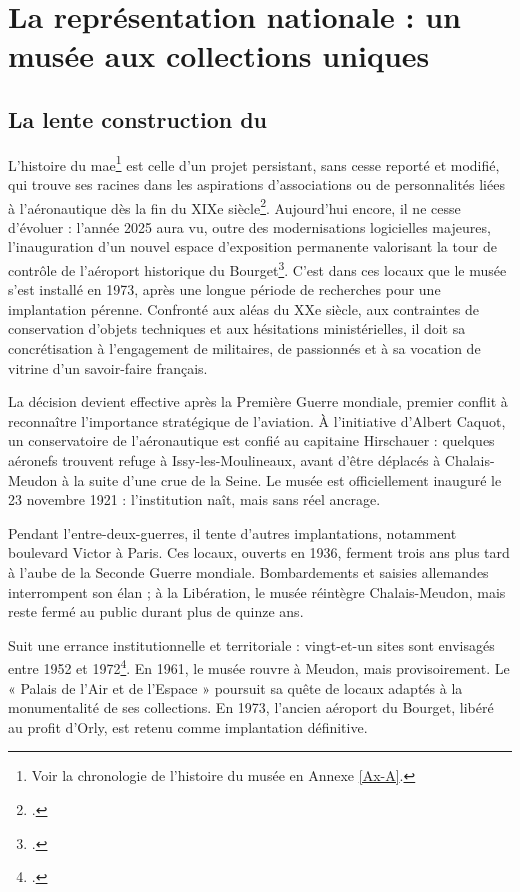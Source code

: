 \section{\label{I-A-1}La représentation nationale : un musée aux collections uniques}

\subsection{La lente construction du \mae}

L’histoire du \acf{mae}\footnote{Voir la chronologie de l'histoire du musée en Annexe \ref{Ax-A}.} est celle d’un projet persistant, sans cesse reporté et modifié, qui trouve ses racines dans les aspirations d'associations ou de personnalités liées à l'aéronautique dès la fin du XIXe siècle\footcite{terrierAeroportParisBourget2019}. Aujourd'hui encore, il ne cesse d'évoluer : l’année 2025 aura vu, outre des modernisations logicielles majeures, l'inauguration d’un nouvel espace d’exposition permanente valorisant la tour de contrôle de l’aéroport historique du Bourget\footcite{museedelairetdelespaceHallNavigationAerienne2025}. 
C’est dans ces locaux que le musée s’est installé en 1973, après une longue période de recherches pour une implantation pérenne. Confronté aux aléas du XXe siècle, aux contraintes de conservation d’objets techniques et aux hésitations ministérielles, il doit sa concrétisation à l’engagement de militaires, de passionnés et à sa vocation de vitrine d’un savoir-faire français.

La décision devient effective après la Première Guerre mondiale, premier conflit à reconnaître l’importance stratégique de l’aviation. À l’initiative d’Albert Caquot, un conservatoire de l’aéronautique est confié au capitaine Hirschauer : quelques aéronefs trouvent refuge à Issy-les-Moulineaux, avant d’être déplacés à Chalais-Meudon à la suite d’une crue de la Seine. Le musée est officiellement inauguré le 23 novembre 1921 : l’institution naît, mais sans réel ancrage.

Pendant l’entre-deux-guerres, il tente d’autres implantations, notamment boulevard Victor à Paris. Ces locaux, ouverts en 1936, ferment trois ans plus tard à l’aube de la Seconde Guerre mondiale. Bombardements et saisies allemandes interrompent son élan ; à la Libération, le musée réintègre Chalais-Meudon, mais reste fermé au public durant plus de quinze ans.

Suit une errance institutionnelle et territoriale : vingt-et-un sites sont envisagés entre 1952 et 1972\footcite{terrierAeroportParisBourget2019}. En 1961, le musée rouvre à Meudon, mais provisoirement. Le « Palais de l’Air et de l’Espace » poursuit sa quête de locaux adaptés à la monumentalité de ses collections. En 1973, l’ancien aéroport du Bourget, libéré au profit d’Orly, est retenu comme implantation définitive.

